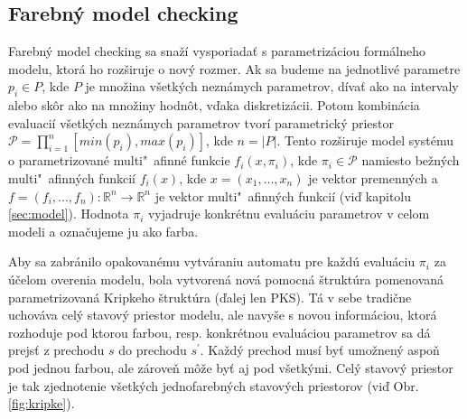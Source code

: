 \documentclass[11pt,final,oneside]{fithesis}
\begin{document}
\subsection{Farebn\' y model checking}
\label{sec:coloredMC}
Farebn\'y model checking sa sna\v z\'i vysporiada\v t s parametriz\'aciou form\'alneho modelu, ktor\'a ho roz\v siruje o nov\'y
rozmer. Ak sa budeme na jednotliv\'e parametre $p_i \in P$, kde $P$ je mno\v zina v\v setk\'ych nezn\'amych parametrov, d\'iva\v t ako na intervaly alebo 
sk\^ or ako na mno\v ziny hodn\^ ot, v\v daka diskretiz\'acii. Potom kombin\'acia evaluaci\'i v\v setk\'ych nezn\'amych parametrov tvor\'i parametrick\'y
priestor $\mathcal{P} = \prod_{i = 1}^n [min(p_i),max(p_i)]$, kde $n = |P|$. Tento roz\v siruje model syst\'emu o parametrizovan\'e multi"~afinn\'e funkcie 
$f_i(x,\pi_i)$, kde $\pi_i \in \mathcal{P}$ namiesto be\v zn\'ych multi"~afinn\'ych funkci\'i $f_i(x)$, kde $x = (x_1,\dots{},x_n)$ je vektor premenn\'ych
a $f = (f_i,\dots{},f_n) : \mathbb{R}^n \rightarrow \mathbb{R}^n$ je vektor multi"~afinn\'ych funkci\'i (vi\v d kapitolu \ref{sec:model}). Hodnota $\pi_i$
vyjadruje konkr\'etnu evalu\'aciu parametrov v celom modeli a ozna\v cujeme ju ako farba.

Aby sa zabr\'anilo opakovan\'emu vytv\'araniu automatu pre ka\v zd\'u evalu\'aciu $\pi_i$ za \'u\v celom overenia modelu, bola vytvoren\'a nov\'a pomocn\'a
\v strukt\'ura pomenovan\'a parametrizovan\'a Kripkeho \v strukt\'ura (\v dalej len PKS). T\'a v sebe tradi\v cne uchov\'ava cel\'y stavov\'y priestor modelu,
ale navy\v se s novou inform\'aciou, ktor\'a rozhoduje pod ktorou farbou, resp. konkr\'etnou evalu\'aciou parametrov sa d\'a prejs\v t z prechodu $s$ 
do prechodu $s^{'}$. Ka\v zd\'y prechod mus\'i by\v t umo\v znen\'y aspo\v n pod jednou farbou, ale z\'arove\v n m\^ o\v ze by\v t aj pod v\v setk\'ymi. Cel\'y
stavov\'y priestor je tak zjednotenie v\v setk\'ych jednofarebn\'ych stavov\'ych priestorov (vi\v d Obr. \ref{fig:kripke}).
\end{document}
